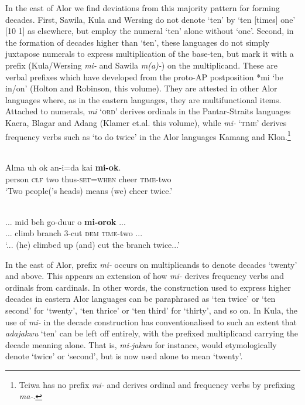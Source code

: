 \documentclass[output=paper]{LSP/langsci}
\begin{document}
In the east of Alor we find deviations from this majority pattern for forming decades. First, Sawila, Kula and Wersing do not denote `ten' by `ten [times] one' [10 1] as elsewhere, but employ the numeral `ten' alone without `one'. Second, in the formation of decades higher than `ten', these languages do not simply juxtapose numerals to express multiplication of the base-ten, but mark it with a prefix (Kula/Wersing \textit{mi-} and Sawila \textit{m(a)-}) on the multiplicand. These are verbal prefixes which have developed from the proto-AP postposition *mi `be in/on' (Holton and Robinson, this volume). They are attested in other Alor languages where, as in the eastern languages, they are multifunctional items. Attached to numerals, \textit{mi} \textsc{`ord'} derives ordinals in the Pantar-Straits languages Kaera, Blagar and Adang (Klamer et.al. this volume), while \textit{mi-} \textsc{`time'} derives frequency verbs such as `to do twice' in the Alor languages Kamang and Klon.\footnote{{}   Teiwa has no prefix \textit{mi-} and derives ordinal and frequency verbs by prefixing \textit{ma-}.}   



\ea%
\label{ex:6:13}
\\
\gll  Alma    uh    ok    an-i{\ng}=da{\ng}    kai    \textbf{mi-ok}.\\
     person  \textsc{clf}  two  thus-\textsc{set=when}  cheer  \textsc{time}{}-two  \\
\glt `Two people('s heads) means (we) cheer twice.'
\z

  







\ea%
\label{ex:6:14}
\\
\gll   ... mid  beh     go-duur  o  \textbf{mi-orok} ...\\
      ... climb  branch    3-cut    \textsc{dem}  \textsc{time}{}-two ... \\
\glt `... (he) climbed up (and) cut the branch twice...'
\z



 



In the east of Alor, prefix \textit{mi-} occurs on multiplicands to denote decades `twenty' and above. This appears an extension of how \textit{mi-}\textsc{} derives frequency verbs and ordinals from cardinals. In other words, the construction used to express higher decades in eastern Alor languages can be paraphrased as `ten twice' or `ten second' for `twenty', `ten thrice' or `ten third' for `thirty', and so on. In Kula, the use of \textit{mi-} in the decade construction has conventionalised to such an extent that \textit{adajakwu} `ten' can be left off entirely, with the prefixed multiplicand carrying the decade meaning alone. That is, \textit{mi-jakwu} for instance, would etymologically denote `twice' or `second', but is now used alone to mean `twenty'.
\end{document}

